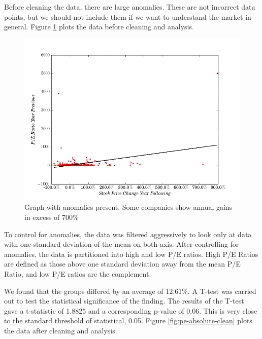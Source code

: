 \documentclass{report}
\begin{document}
Before cleaning the data, there are large anomalies. These are not incorrect data points, but we should not include them if we want to understand the market in general. Figure \ref{fig:pe-absolute-unclean} plots the data before cleaning and analysis.

\begin{figure}
	\caption{Graph with anomalies present. Some companies show annual gains in excess of 700\%}
	\centerline{\includegraphics[width=\textwidth]{../work/fundamentals/absolute_pe_ratio_returns_unclean.png}}
	\label{fig:pe-absolute-unclean}
\end{figure}

To control for anomalies, the data was filtered aggressively to look only at data with one standard deviation of the mean on both axis. After controlling for anomalies, the data is partitioned into high and low P/E ratios. High P/E Ratios are defined as those above one standard deviation away from the mean P/E Ratio, and low P/E ratios are the complement. 

We found that the groups differed by an average of 12.61\%. A T-test was carried out to test the statistical significance of the finding. The results of the T-test gave a t-statistic of 1.8825 and a corresponding p-value of 0.06. This is very close to the standard threshold of statistical, 0.05. Figure \ref{fig:pe-absolute-clean} plots the data after cleaning and analysis.
\end{document}
